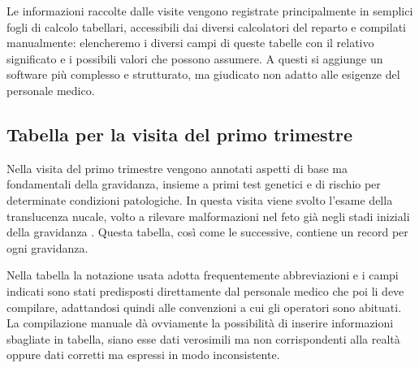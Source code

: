 Le informazioni raccolte dalle visite vengono registrate principalmente in semplici fogli di calcolo tabellari, accessibili dai diversi calcolatori del reparto e compilati manualmente: elencheremo i diversi campi di queste tabelle con il relativo significato e i possibili valori che possono assumere.
A questi si aggiunge un software più complesso e strutturato, ma giudicato non adatto alle esigenze del personale medico.

\subsection{Tabella per la visita del primo trimestre}
\label{firsttrimester}

Nella visita del primo trimestre vengono annotati aspetti di base ma fondamentali della gravidanza, insieme a primi test genetici e di rischio per determinate condizioni patologiche.
In questa visita viene svolto l'esame della translucenza nucale, volto a rilevare malformazioni nel feto già negli stadi iniziali della gravidanza \cite{Sou05}.
Questa tabella, così come le successive, contiene un record per ogni gravidanza.

Nella tabella la notazione usata adotta frequentemente abbreviazioni e i campi indicati sono stati predisposti direttamente dal personale medico che poi li deve compilare, adattandosi quindi alle convenzioni a cui gli operatori sono abituati.
La compilazione manuale dà ovviamente la possibilità di inserire informazioni sbagliate in tabella, siano esse dati verosimili ma non corrispondenti alla realtà oppure dati corretti ma espressi in modo inconsistente.

